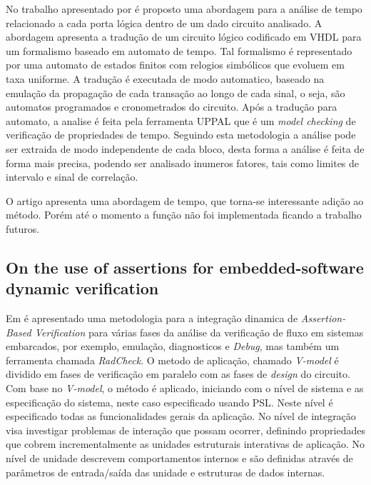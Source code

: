 No trabalho apresentado por \citeauthor{bara2010formal} é proposto uma abordagem para a análise de tempo relacionado a cada porta lógica dentro de um dado circuito analisado. A abordagem apresenta a tradução de um circuito lógico codificado em VHDL para um formalismo baseado em automato de tempo. Tal formalismo é representado por uma automato de estados finitos com relogios simbólicos que evoluem em taxa uniforme. A tradução é executada de modo automatico, baseado na emulação da propagação de cada transação ao longo de cada sinal, o seja, são automatos programados e cronometrados do circuito. Após a tradução para automato, a analise é feita pela ferramenta UPPAL que é um \textit{model checking} de verificação de propriedades de tempo. Seguindo esta metodologia a análise pode ser extraida de modo independente de cada bloco, desta forma a análise é feita de forma mais precisa, podendo ser analisado inumeros fatores, tais como limites de intervalo e sinal de correlação.

\par
O artigo apresenta uma abordagem de tempo, que torna-se interessante adição ao método. Porém até o momento a função não foi implementada ficando a trabalho futuros.

\subsection{On the use of assertions for embedded-software dynamic verification}

Em \citeauthor{di2012use} é apresentado uma metodologia para a integração dinamica de \textit{Assertion-Based Verification} para várias fases da análise da verificação de fluxo em sistemas embarcados, por exemplo, emulação, diagnosticos e \textit{Debug}, mas também um ferramenta chamada \textit{RadCheck}. O metodo de aplicação, chamado \textit{V-model} é dividido em fases de verificação em paralelo com as fases de \textit{design} do circuito. Com base no \textit{V-model}, o método é aplicado, iniciando com o nível de sistema e as especificação do sistema, neste caso especificado usando PSL. Neste nível é especificado todas as funcionalidades gerais da aplicação. No nível de integração visa investigar problemas de interação que possam ocorrer, definindo propriedades que cobrem incrementalmente as unidades estruturais interativas de aplicação. No nível de unidade descrevem comportamentos internos e são definidas através de parâmetros de entrada/saída das unidade e estruturas de dados internas.

